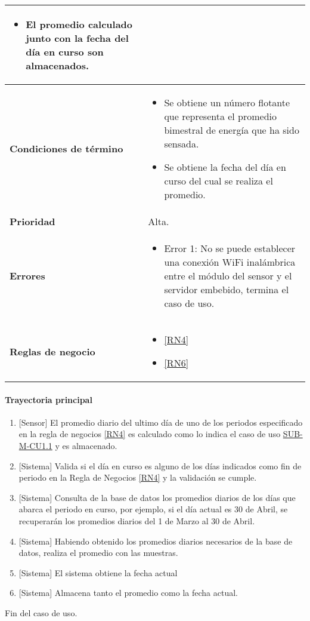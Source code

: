 \begin{longtable}{|J{5cm}|J{10.3cm}|}
		\begin{itemize}
			\item El promedio calculado junto con la fecha del día en curso son almacenados.
		\end{itemize}\\ \hline
	\textbf{Condiciones de término} & 
		\begin{itemize}
			\item Se obtiene un número flotante que representa el promedio bimestral de energía que ha sido sensada.
			\item Se obtiene la fecha del día en curso del cual se realiza el promedio.
		\end{itemize} \\ \hline 
	\textbf{Prioridad} & 
		Alta. \\ \hline
	\textbf{Errores} & 
		\begin{itemize}
			\item \label{SUB-M-CU1:Error1} Error 1: No se puede establecer una conexión WiFi inalámbrica entre el módulo del sensor y el servidor embebido, termina el caso de uso.
		\end{itemize} \\ \hline
	\textbf{Reglas de negocio} & 
		\begin{itemize}
			\item \ref{RN4}
			\item \ref{RN6}
		\end{itemize} \\ \hline

\end{longtable}

\paragraph{Trayectoria principal}
	\begin{enumerate}
		\item {[Sensor]} El promedio diario del ultimo día de uno de los periodos especificado en la regla de negocios \ref{RN4} es calculado como lo indica el caso de uso \hyperref[SUB-M-CU1.1]{SUB-M-CU1.1} y es almacenado.
		\item {[Sistema]} Valida si el día en curso es alguno de los días indicados como fin de periodo en la Regla de Negocios \ref{RN4} y la validación se cumple.
		\item  {[Sistema]} Consulta de la base de datos los promedios diarios de los días que abarca el periodo en curso, por ejemplo, si el día actual es 30 de Abril, se recuperarán los promedios diarios del 1 de Marzo al 30 de Abril.
		\item {[Sistema]} Habiendo obtenido los promedios diarios necesarios de la base de datos, realiza el promedio con las muestras.
		\item {[Sistema]} El sistema obtiene la fecha actual
		\item {[Sistema]} Almacena tanto el promedio como la fecha actual.
	\end{enumerate}
	Fin del caso de uso.
